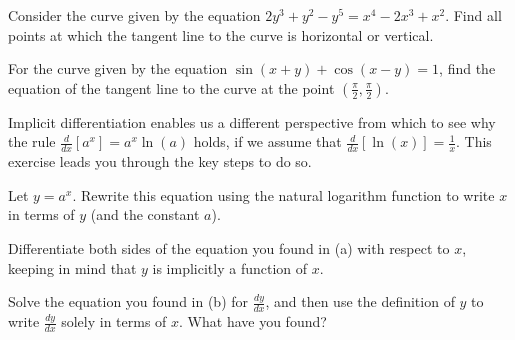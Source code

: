 \begin{exercises} 
  \item Consider the curve given by the equation $2y^3+y^2-y^5 = x^4 - 2x^3  + x^2$.  Find all points at which the tangent line to the curve is horizontal or vertical.
  \item For the curve given by the equation $\sin(x+y) + \cos(x-y) = 1$, find the equation of the tangent line to the curve at the point $(\frac{\pi}{2}, \frac{\pi}{2})$.
  \item Implicit differentiation enables us a different perspective from which to see why the rule $\frac{d}{dx} [a^x] = a^x \ln(a)$ holds, if we assume that $\frac{d}{dx}[\ln(x)] = \frac{1}{x}$.  This exercise leads you through the key steps to do so.
  	\ba
		\item Let $y = a^x$.  Rewrite this equation using the natural logarithm function to write $x$ in terms of $y$ (and the constant $a$).
		\item Differentiate both sides of the equation you found in (a) with respect to $x$, keeping in mind that $y$ is implicitly a function of $x$.
		\item Solve the equation you found in (b) for $\frac{dy}{dx}$, and then use the definition of $y$ to write $\frac{dy}{dx}$ solely in terms of $x$.  What have you found?
	\ea
\end{exercises}
\afterexercises